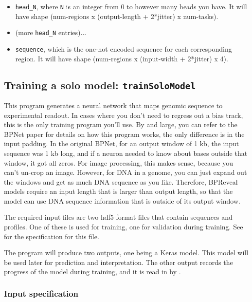 \documentclass{article}
\begin{document}
\begin{itemize}
    \item \texttt{head\_N}, where \texttt{N} is an integer from 0 to however
        many heads you have.
        It will have shape
        (num-regions x (output-length + 2*jitter) x num-tasks).
    \item (more \texttt{head\_N} entries)...
    \item \texttt{sequence}, which is the one-hot encoded sequence for each
        corresponding region.
        It will have shape (num-regions x (input-width + 2*jitter) x 4).
\end{itemize}


\newpage


\subsection{Training a solo model: \texttt{trainSoloModel}}\label{prog:trainSoloModel}

This program generates a neural network that maps genomic sequence to
experimental readout.
In cases where you don't need to regress out a bias track, this is the only
training program you'll use.
By and large, you can refer to the BPNet paper for details on how this program
works, the only difference is in the input padding.
In the original BPNet, for an output window of 1 kb, the input sequence was
1 kb long, and if a neuron needed to know about bases outside that window, it
got all zeros.
For image processing, this makes sense, because you can't un-crop an image.
However, for DNA in a genome, you can just expand out the windows and get as
much DNA sequence as you like.
Therefore, BPReveal models require an input length that is larger than output
length, so that the model can use DNA sequence information that is outside of
its output window.

The required input files are two hdf5-format files that contain sequences and
profiles.
One of these is used for training, one for validation during training.
See  for the specification for this file.

The program will produce two outputs, one being a Keras model.
This model will be used later for prediction and interpretation.
The other output records the progress of the model during training, and it is
read in by .


\subsubsection{Input specification}
\end{document}
